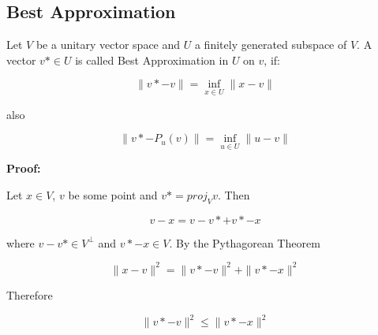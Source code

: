 \subsection{Best Approximation}

Let \(V\) be a unitary vector space and \(U\) a finitely generated subspace of \(V\).
A vector \(v* \in U\) is called Best Approximation in \(U\) on \(v\), if:

\[
    \|v* - v\| = \inf_{x \in U}\|x - v\|
\]

also

\[
    \|v* - P_u(v)\| = \inf_{u \in U}\|u - v\|
\]

\textbf{Proof:}

Let \(x \in V\), \(v\) be some point and \(v* = proj_{V} v\). Then 

\[
    v - x = v - v* + v* - x
\]

where \(v - v* \in V^{\bot}\) and \(v* - x \in V\). By the Pythagorean Theorem

\[
    \| x - v \|^2 = \|v* - v\|^2 + \|v* - x\|^2
\]

Therefore

\[
    \|v* - v\|^2 \le \|v* - x\|^2
\]

\QED

